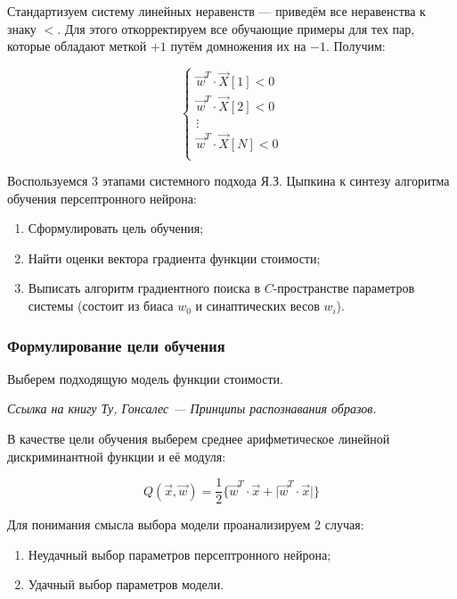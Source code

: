 \documentclass[a4paper]{article}
\numberwithin{equation}{subsection}
\begin{document}
Стандартизуем систему линейных неравенств --- приведём все неравенства к знаку $<$. 
Для этого откорректируем все обучающие примеры для тех пар, которые обладают меткой
$+1$ путём домножения их на $-1$. Получим:

\begin{equation}
    \begin{cases}
        \vec{w}^T \cdot \vec{X}[1] < 0 \\
        \vec{w}^T \cdot \vec{X}[2] < 0 \\
        \vdots \\
        \vec{w}^T \cdot \vec{X}[N] < 0 \\
    \end{cases}
    \label{eq:ineq_system}
\end{equation}

Воспользуемся 3 этапами системного подхода Я.З. Цыпкина к синтезу алгоритма обучения
персептронного нейрона:
\begin{enumerate}
    \item Сформулировать цель обучения;
    \item Найти оценки вектора градиента функции стоимости;
    \item Выписать алгоритм градиентного поиска в $C$-пространстве параметров системы
    (состоит из биаса $w_0$ и синаптических весов $w_i$).
\end{enumerate}




\subsubsection{Формулирование цели обучения}

Выберем подходящую модель функции стоимости.

\begin{myquote}
    \textit{Ссылка на книгу Ту, Гонсалес --- Принципы распознавания образов.}
\end{myquote}

В качестве цели обучения выберем среднее арифметическое линейной дискриминантной 
функции и её модуля:

\begin{equation}
    Q(\vec{x}, \vec{w}) = \dfrac{1}{2} \{ \vec{w}^T \cdot \vec{x} + \lvert \vec{w}^T \cdot \vec{x}  \rvert \}
    \label{eq:weight_func_simple}
\end{equation}

Для понимания смысла выбора модели проанализируем 2 случая:
\begin{enumerate}
    \item Неудачный выбор параметров персептронного нейрона;
    \item Удачный выбор параметров модели.
\end{enumerate}
\end{document}
